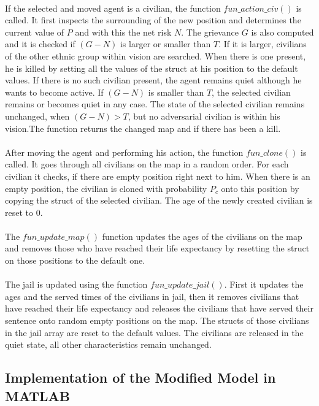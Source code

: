 \documentclass[11pt]{article}
\begin{document}
\\
If the selected and moved agent is a civilian, the function $fun\_action\_civ()$ is called. It first inspects the surrounding of the new position and determines the current value of $P$ and with this the net risk $N$. The grievance $G$ is also computed and it is checked if $(G-N)$ is larger or smaller than $T$. If it is larger, civilians of the other ethnic group within vision are searched. When there is one present, he is killed by setting all the values of the struct at his position to the default values. If there is no such civilian present, the agent remains quiet although he wants to become active. If $(G-N)$ is smaller than $T$, the selected civilian remains or becomes quiet in any case. The state of the selected civilian remains unchanged, when $(G-N) > T$, but no adversarial civilian is within his vision.The function returns the changed map and if there has been a kill.\\
\\
After moving the agent and performing his action, the function $fun\_clone()$ is called. It goes through all civilians on the map in a random order. For each civilian it checks, if there are empty position right next to him. When there is an empty position, the civilian is cloned with probability $P_c$ onto this position by copying the struct of the selected civilian. The age of the newly created civilian is reset to 0.\\
\\
The $fun\_update\_map()$ function updates the ages of the civilians on the map and removes those who have reached their life expectancy by resetting the struct on those positions to the default one.\\
\\
The jail is updated using the function $fun\_update\_jail()$. First it updates the ages and the served times of the civilians in jail, then it removes civilians that have reached their life expectancy and releases the civilians that have served their sentence onto random empty positions on the map. The structs of those civilians in the jail array are reset to the default values. The civilians are released in the quiet state, all other characteristics remain unchanged.

\subsection{Implementation of the Modified Model in MATLAB}
\label{sec:imp_mod}
\end{document}
